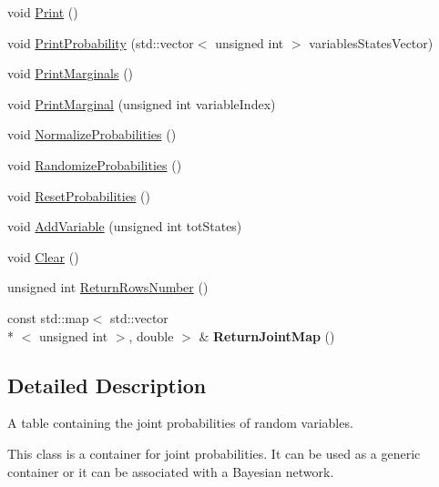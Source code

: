 \begin{DoxyCompactItemize}
\item 
void \hyperlink{classbayonet_1_1_joint_probability_table_ade691120f2a61325b94a7f9e85dd21f8}{Print} ()
\item 
void \hyperlink{classbayonet_1_1_joint_probability_table_ac52835cb75b2d635b51843abf58311a9}{Print\-Probability} (std\-::vector$<$ unsigned int $>$ variables\-States\-Vector)
\item 
void \hyperlink{classbayonet_1_1_joint_probability_table_a73e7e3843c63192e37d11bd9916f0587}{Print\-Marginals} ()
\item 
void \hyperlink{classbayonet_1_1_joint_probability_table_ada1f39508ba6a128d9f0405efe1257a7}{Print\-Marginal} (unsigned int variable\-Index)
\item 
void \hyperlink{classbayonet_1_1_joint_probability_table_aa244b70256292fd00f8cd7bf1e8e7ed1}{Normalize\-Probabilities} ()
\item 
void \hyperlink{classbayonet_1_1_joint_probability_table_a91133b2cf610076459a641b458c898cd}{Randomize\-Probabilities} ()
\item 
void \hyperlink{classbayonet_1_1_joint_probability_table_a1d099395c21a1ec57df4ffbaa1b85484}{Reset\-Probabilities} ()
\item 
void \hyperlink{classbayonet_1_1_joint_probability_table_a34def84ddda0e58303d552055057b884}{Add\-Variable} (unsigned int tot\-States)
\item 
void \hyperlink{classbayonet_1_1_joint_probability_table_a61a82adc62427272e5aa84ace3fc15a6}{Clear} ()
\item 
unsigned int \hyperlink{classbayonet_1_1_joint_probability_table_af87920fcfa20657c2c3eb816a77ea66b}{Return\-Rows\-Number} ()
\item 
\hypertarget{classbayonet_1_1_joint_probability_table_a6172ff11f3cc9e2f6eb0ae42eb3fcb47}{const std\-::map$<$ std\-::vector\\*
$<$ unsigned int $>$, double $>$ \& {\bfseries Return\-Joint\-Map} ()}\label{classbayonet_1_1_joint_probability_table_a6172ff11f3cc9e2f6eb0ae42eb3fcb47}

\end{DoxyCompactItemize}


\subsection{Detailed Description}
A table containing the joint probabilities of random variables. 

This class is a container for joint probabilities. It can be used as a generic container or it can be associated with a Bayesian network. 

